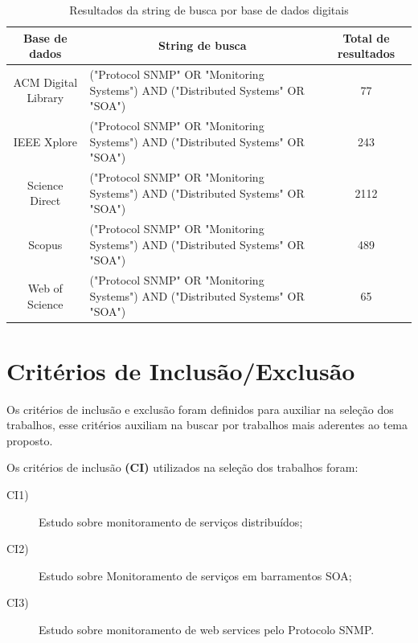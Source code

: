 \begin{table}[!ht]

\centering
\caption{Resultados da string de busca por base de dados digitais}
\label{TabelaRsb}

\begin{tabular}{|c|p{8cm}|c|}
\hline
\multicolumn{1}{|c|}{Base de dados} & \multicolumn{1}{c|}{String de busca}                                           & Total de resultados \\ \hline
ACM Digital Library                 & ("Protocol SNMP" OR "Monitoring Systems") AND ("Distributed Systems" OR "SOA") & 77                  \\ \hline
IEEE Xplore                         & ("Protocol SNMP" OR "Monitoring Systems") AND ("Distributed Systems" OR "SOA") & 243                 \\ \hline
Science Direct                      & ("Protocol SNMP" OR "Monitoring Systems") AND ("Distributed Systems" OR "SOA") & 2112                \\ \hline
Scopus                              & ("Protocol SNMP" OR "Monitoring Systems") AND ("Distributed Systems" OR "SOA") & 489                 \\ \hline
Web of Science                      & ("Protocol SNMP" OR "Monitoring Systems") AND ("Distributed Systems" OR "SOA") & 65                  \\ \hline
\end{tabular}
\end{table}

\section{Critérios de Inclusão/Exclusão}
Os critérios de inclusão e exclusão foram definidos para auxiliar na seleção dos trabalhos, esse critérios auxiliam na buscar por trabalhos mais aderentes ao tema proposto. 

Os critérios de inclusão \textbf{(CI)} utilizados na seleção dos trabalhos foram:

\begin{description}

\item[CI1)] Estudo sobre monitoramento de serviços distribuídos;
\item[CI2)] Estudo sobre Monitoramento de serviços em barramentos SOA;
\item[CI3)] Estudo sobre monitoramento de web services pelo Protocolo SNMP.
\end{description}

